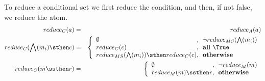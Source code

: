 To reduce a conditional set we first reduce the condition,
and then, if not false, we reduce the atom.
\begin{eqnarray*}
  reduce_C(a) &=& reduce_A(a)
\\ reduce_C(\bigwedge(m_i) \sthen c)
  &=&
  \left\{\begin{array}{l@{,~~}l}
    \emptyset & \lnot reduce_{MS}(\bigwedge(m_i)) \\
    reduce_C(c) & \textbf{all } \True \\
    reduce_{MS}(\bigwedge(m_i)) \sthen reduce_C(c) & \textbf{otherwise}
  \end{array}
  \right.
\\ reduce_C(m \ssthen r)
  &=&
  \left\{\begin{array}{l@{,~~}l}
    \emptyset & \lnot reduce_M(m) \\
    reduce_M(m) \ssthen r & \textbf{otherwise}
  \end{array}
  \right.
\end{eqnarray*}
